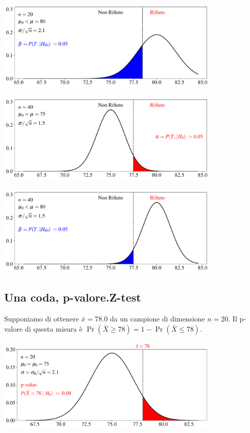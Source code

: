 \documentclass[12pt,openany]{book}
\theoremstyle{mio}
\theoremstyle{liscio}
\begin{document}
\hfil\includegraphics[width=0.8\textwidth]{figure/Z-test_02.pdf}

\hfil\includegraphics[width=0.8\textwidth]{figure/Z-test_03.pdf}

\hfil\includegraphics[width=0.8\textwidth]{figure/Z-test_04.pdf}





\hfill{}\clearpage\subsection{Una coda, p-valore.\hfill Z-test}


Supponiamo di ottenere $\bar x=78.0$ da un campione di dimensione $n=20$. Il p-valore di questa misura è $\Pr(\bar X\ge 78)=1-\Pr(\bar X\le 78)$.

\hfil\includegraphics[width=0.8\textwidth]{figure/Z-test-p-val_01.pdf}
\end{document}
